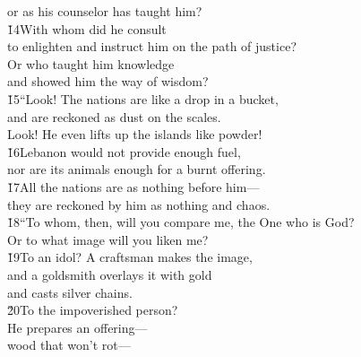 \begin{poetry}
\poemll    or as his counselor has taught him? \\
\poeml \v{14}With whom did he consult \\
\poemll    to enlighten and instruct him on the path of justice? \\
\poeml Or who taught him knowledge \\
\poemll    and showed him the way of wisdom? \\
\poeml \v{15}``Look! The nations are like a drop in a bucket, \\
\poemll    and are reckoned as dust on the scales. \\
\poeml Look! He even lifts up the islands like powder! \\
\poeml \v{16}Lebanon would not provide enough fuel, \\
\poemll    nor are its animals enough for a burnt offering. \\
\poeml \v{17}All the nations are as nothing before him--- \\
\poemll    they are reckoned by him as nothing and chaos. \\
\poeml \v{18}``To whom, then, will you compare me, the One who is God? \\
\poemll    Or to what image will you liken me? \\
\poeml \v{19}To an idol? A craftsman makes the image, \\
\poemll    and a goldsmith overlays it with gold \\
\poemlll       and casts silver chains. \\
\poeml \v{20}To the impoverished person? \\
\poemll    He prepares an offering--- \\
\poemlll       wood that won't rot--- \\

\end{poetry}
